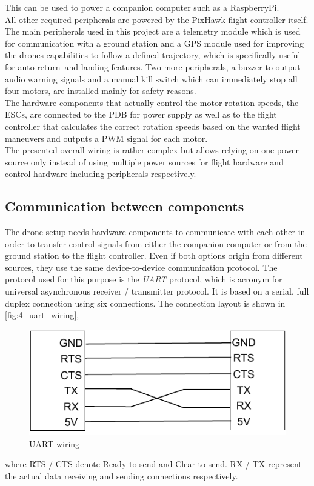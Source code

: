 This can be used to power a companion computer such as a RaspberryPi.\\
All other required peripherals are powered by the PixHawk flight controller
itself.
The main peripherals used in this project are a telemetry module which is used
for communication with a ground station and a \ac{GPS} module used for
improving the drones capabilities to follow a defined trajectory, which is
specifically useful for auto-return~and landing features.
Two more peripherals, a buzzer to output audio warning signals and a manual
kill switch which can immediately stop all four motors, are installed mainly
for safety reasons.\\
The hardware components that actually control the motor rotation speeds,
the \acp{ESC}, are connected to the \ac{PDB} for power supply as well as to
the flight controller that calculates the correct rotation speeds based on the
wanted flight maneuvers and outputs a \ac{PWM} signal for each motor.\\
The presented overall wiring is rather complex but allows relying on one power
source only instead of using multiple power sources for flight hardware and
control hardware including peripherals respectively.

\subsection*{Communication between components}\label{subsec:4_comm}
The drone setup needs hardware components to communicate with each other in 
order to transfer control signals from either the companion computer or from
the ground station to the flight controller.
Even if both options origin from different sources, they use the same
device-to-device communication protocol.
The protocol used for this purpose is the \textit{UART} protocol, which is
acronym for universal asynchronous receiver / transmitter protocol.
It is based on a serial, full duplex connection using six connections.
The connection layout is shown in \autoref{fig:4_uart_wiring},
\begin{figure}[!h]
    \centering
    \includegraphics[scale=0.8]{uart_wiring.pdf}
    \caption[UART wiring]{UART wiring}
    \label{fig:4_uart_wiring}
\end{figure}
\FloatBarrier
\noindent where RTS / CTS denote Ready to send and Clear to send.
RX / TX represent the actual data receiving and sending connections
respectively.\\

